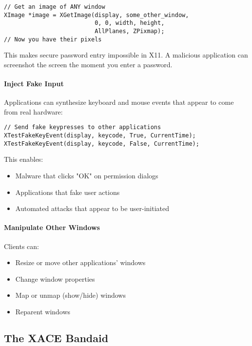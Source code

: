 \begin{lstlisting}[style=cstyle, caption=Reading Other Windows' Content]
// Get an image of ANY window
XImage *image = XGetImage(display, some_other_window,
                          0, 0, width, height,
                          AllPlanes, ZPixmap);
// Now you have their pixels
\end{lstlisting}

This makes secure password entry impossible in X11. A malicious application can screenshot the screen the moment you enter a password.

\paragraph{Inject Fake Input}
Applications can synthesize keyboard and mouse events that appear to come from real hardware:

\begin{lstlisting}[style=cstyle, caption=Fake Input Injection]
// Send fake keypresses to other applications
XTestFakeKeyEvent(display, keycode, True, CurrentTime);
XTestFakeKeyEvent(display, keycode, False, CurrentTime);
\end{lstlisting}

This enables:
\begin{itemize}
    \item Malware that clicks "OK" on permission dialogs
    \item Applications that fake user actions
    \item Automated attacks that appear to be user-initiated
\end{itemize}

\paragraph{Manipulate Other Windows}
Clients can:
\begin{itemize}
    \item Resize or move other applications' windows
    \item Change window properties
    \item Map or unmap (show/hide) windows
    \item Reparent windows
\end{itemize}

\subsection{The XACE Bandaid}

